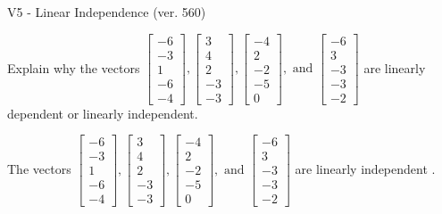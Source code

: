 \begin{exercise}
  \begin{exerciseTitle}V5 - Linear Independence (ver. 560)\end{exerciseTitle}
  \begin{exerciseStatement}
    Explain why the vectors \(\left[\begin{array}{r}
-6 \\
-3 \\
1 \\
-6 \\
-4
\end{array}\right] , \left[\begin{array}{r}
3 \\
4 \\
2 \\
-3 \\
-3
\end{array}\right] , \left[\begin{array}{r}
-4 \\
2 \\
-2 \\
-5 \\
0
\end{array}\right] , \text{ and } \left[\begin{array}{r}
-6 \\
3 \\
-3 \\
-3 \\
-2
\end{array}\right]\) are linearly dependent or linearly independent.	


  \end{exerciseStatement}
  \begin{exerciseAnswer}
   The vectors \(\left[\begin{array}{r}
-6 \\
-3 \\
1 \\
-6 \\
-4
\end{array}\right] , \left[\begin{array}{r}
3 \\
4 \\
2 \\
-3 \\
-3
\end{array}\right] , \left[\begin{array}{r}
-4 \\
2 \\
-2 \\
-5 \\
0
\end{array}\right] , \text{ and } \left[\begin{array}{r}
-6 \\
3 \\
-3 \\
-3 \\
-2
\end{array}\right]\) are 
  	 linearly independent  .
  


  \end{exerciseAnswer}
\end{exercise}